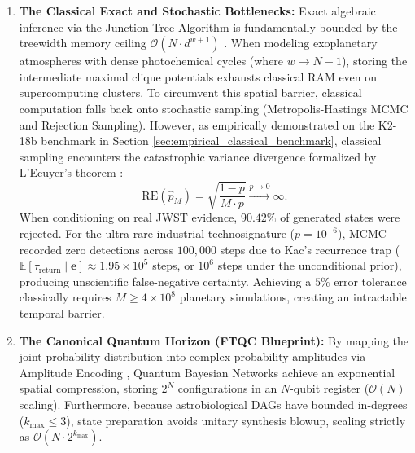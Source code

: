 \begin{enumerate}
    \item \textbf{The Classical Exact and Stochastic Bottlenecks:} Exact algebraic inference via the Junction Tree Algorithm is fundamentally bounded by the treewidth memory ceiling $\mathcal{O}(N \cdot d^{w+1})$ \cite{cooper1990}. When modeling exoplanetary atmospheres with dense photochemical cycles (where $w \to N-1$), storing the intermediate maximal clique potentials exhausts classical RAM even on supercomputing clusters. To circumvent this spatial barrier, classical computation falls back onto stochastic sampling (Metropolis-Hastings MCMC and Rejection Sampling). However, as empirically demonstrated on the K2-18b benchmark in Section \ref{sec:empirical_classical_benchmark}, classical sampling encounters the catastrophic variance divergence formalized by L'Ecuyer's theorem \cite{lecuyer2010}:
    \begin{equation}
    \mathrm{RE}(\hat{p}_M) = \sqrt{\frac{1-p}{M \cdot p}} \xrightarrow{p \to 0} \infty.
    \end{equation}
    When conditioning on real JWST evidence, $90.42\%$ of generated states were rejected. For the ultra-rare industrial technosignature ($p = 10^{-6}$), MCMC recorded zero detections across $100,000$ steps due to Kac's recurrence trap ($\mathbb{E}[\tau_{\mathrm{return}} \mid \mathbf{e}] \approx 1.95 \times 10^5$ steps, or $10^6$ steps under the unconditional prior), producing unscientific false-negative certainty. Achieving a $5\%$ error tolerance classically requires $M \ge 4 \times 10^8$ planetary simulations, creating an intractable temporal barrier.
    
    \item \textbf{The Canonical Quantum Horizon (FTQC Blueprint):} By mapping the joint probability distribution into complex probability amplitudes via Amplitude Encoding \cite{low2014}, Quantum Bayesian Networks achieve an exponential spatial compression, storing $2^N$ configurations in an $N$-qubit register ($\mathcal{O}(N)$ scaling). Furthermore, because astrobiological DAGs have bounded in-degrees ($k_{\max} \le 3$), state preparation avoids unitary synthesis blowup, scaling strictly as $\mathcal{O}(N \cdot 2^{k_{\max}})$. 
    

\end{enumerate}
